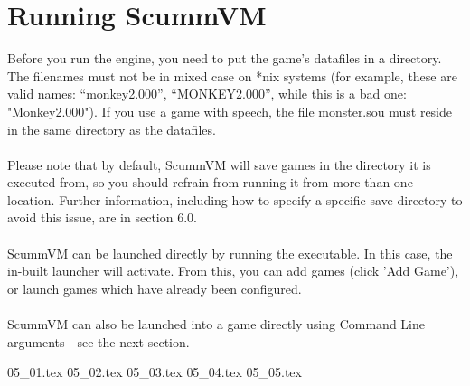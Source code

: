 


\section{Running ScummVM}

Before you run the engine, you need to put the game's datafiles in a
directory. The filenames must not be in mixed case on *nix systems
(for example, these are valid names: ``monkey2.000'', ``MONKEY2.000'', while
this is a bad one: "Monkey2.000"). If you use a game with speech, the file
monster.sou must reside in the same directory as the datafiles.\\
\quad \\
Please note that by default, ScummVM will save games in the directory
it is executed from, so you should refrain from running it from more than
one location. Further information, including how to specify a specific save
directory to avoid this issue, are in section 6.0.\\
\quad \\
ScummVM can be launched directly by running the executable. In this case,
the in-built launcher will activate. From this, you can add games (click
'Add Game'), or launch games which have already been configured.\\
\quad \\
ScummVM can also be launched into a game directly using Command Line
arguments - see the next section.

 {05_01.tex}
 {05_02.tex}
 {05_03.tex}
 {05_04.tex}
 {05_05.tex}

